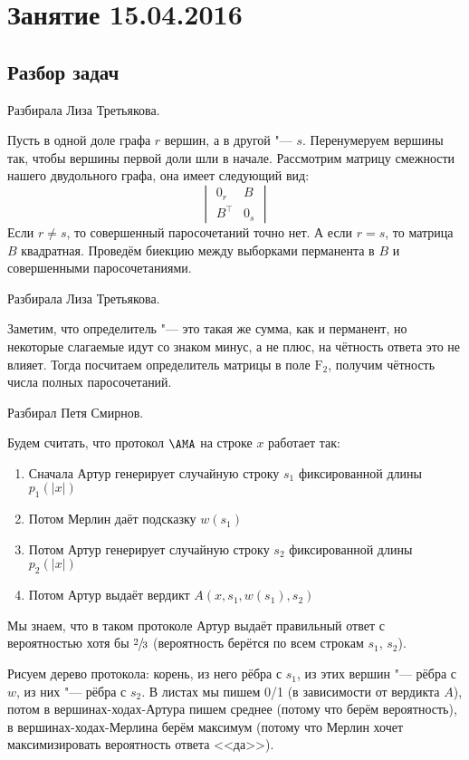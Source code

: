 \chapter{Занятие 15.04.2016}

\section{Разбор задач}
	Разбирала Лиза Третьякова.

	Пусть в одной доле графа $r$ вершин, а в другой "--- $s$.
	Перенумеруем вершины так, чтобы вершины первой доли шли в начале.
	Рассмотрим матрицу смежности нашего двудольного графа, она имеет следующий вид:
	\[
		\begin{vmatrix}
			0_r & B \\
			B^{\top} & 0_s
		\end{vmatrix}
	\]
	Если $r\neq s$, то совершенный паросочетаний точно нет.
	А если $r=s$, то матрица $B$ квадратная.
	Проведём биекцию между выборками перманента в $B$ и совершенными паросочетаниями.
	\TODO

	Разбирала Лиза Третьякова.

	Заметим, что определитель "--- это такая же сумма, как и перманент, но некоторые слагаемые
	идут со знаком минус, а не плюс, на чётность ответа это не влияет.
	Тогда посчитаем определитель матрицы в поле $\mathrm{F}_2$, получим чётность числа полных паросочетаний.

	Разбирал Петя Смирнов.

	Будем считать, что протокол $\AMA$ на строке $x$ работает так:
	\begin{enumerate}
		\item
			Сначала Артур генерирует случайную строку $s_1$ фиксированной длины $p_1(|x|)$
		\item
			Потом Мерлин даёт подсказку $w(s_1)$
		\item
			Потом Артур генерирует случайную строку $s_2$ фиксированной длины $p_2(|x|)$
		\item
			Потом Артур выдаёт вердикт $A(x, s_1, w(s_1), s_2)$
	\end{enumerate}
	Мы знаем, что в таком протоколе Артур выдаёт правильный ответ с вероятностью хотя бы $\sfrac 23$
	(вероятность берётся по всем строкам $s_1$, $s_2$).

	Рисуем дерево протокола: корень, из него рёбра с $s_1$, из этих вершин "--- рёбра с $w$,
	из них "--- рёбра с $s_2$.
	В листах мы пишем 0/1 (в зависимости от вердикта $A$), потом в вершинах-ходах-Артура пишем
	среднее (потому что берём вероятность), в вершинах-ходах-Мерлина берём максимум (потому что
	Мерлин хочет максимизировать вероятность ответа <<да>>).

